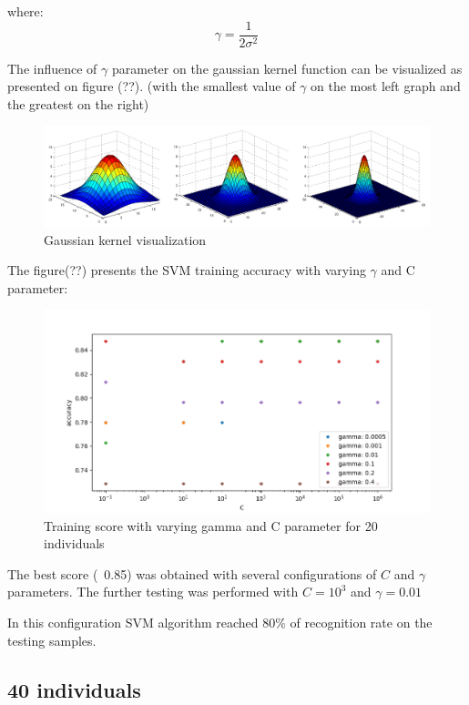 where:
\begin{equation}
\gamma = \frac{1}{2\sigma^2}
\end{equation}

The influence of $\gamma$ parameter on the gaussian kernel function can be visualized as presented on figure (??). (with the smallest value of $\gamma$ on the most left graph and the greatest on the right) 


\begin{figure}[H]
\centering
\includegraphics[scale=0.27]{img/svm/gaussian.png}
\caption{Gaussian kernel visualization}
\end{figure} 

The figure(??) presents the SVM training accuracy with varying $\gamma$ and C parameter:

\begin{figure}[H]
\centering
\includegraphics[scale=0.75]{img/svm/gamma_C_20i.png}
\caption{Training score with varying gamma and C parameter for 20 individuals}
\end{figure} 


The best score (~0.85) was obtained with several configurations of $C$ and $\gamma$ parameters. The further testing was performed with $C = 10^3$ and $\gamma = 0.01$

In this configuration SVM algorithm reached 80\% of recognition rate on the testing samples.


\subsection{40 individuals}

